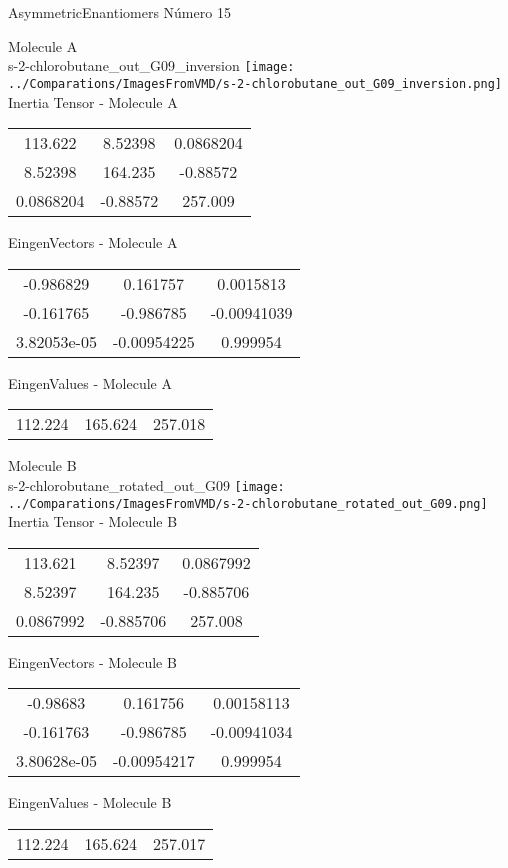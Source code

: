 \vtab[-2cm]
\begin{center}
{\large AsymmetricEnantiomers \tab Número 15}
\end{center}
\begin{multicols}{2}
\begin{center}

Molecule A \\ 
s-2-chlorobutane\_out\_G09\_inversion
\texttt{[image: ../Comparations/ImagesFromVMD/s-2-chlorobutane\_out\_G09\_inversion.png]}
\\
Inertia Tensor - Molecule A \\
\vtab

\begin{tabular}{|c c c|}
113.622	 & 	8.52398	 & 	0.0868204	 \\
8.52398	 & 	164.235	 & 	-0.88572	 \\
0.0868204	 & 	-0.88572	 & 	257.009
\end{tabular}

\vtab
 EingenVectors - Molecule A     \\
\vtab
\begin{tabular}{|c c c|}
-0.986829	 & 	0.161757	 & 	0.0015813	 \\
-0.161765	 & 	-0.986785	 & 	-0.00941039	 \\
3.82053e-05	 & 	-0.00954225	 & 	0.999954
\end{tabular}

\vtab
 EingenValues - Molecule A     \\
\vtab
\begin{tabular}{|c c c|}
112.224	 & 	165.624	 & 	257.018	 \\
\end{tabular}
\columnbreak

Molecule B \\ 
s-2-chlorobutane\_rotated\_out\_G09
\texttt{[image: ../Comparations/ImagesFromVMD/s-2-chlorobutane\_rotated\_out\_G09.png]}
\\
Inertia Tensor - Molecule B \\
\vtab

\begin{tabular}{|c c c|}
113.621	 & 	8.52397	 & 	0.0867992	 \\
8.52397	 & 	164.235	 & 	-0.885706	 \\
0.0867992	 & 	-0.885706	 & 	257.008
\end{tabular}

\vtab
 EingenVectors - Molecule B     \\
\vtab
\begin{tabular}{|c c c|}
-0.98683	 & 	0.161756	 & 	0.00158113	 \\
-0.161763	 & 	-0.986785	 & 	-0.00941034	 \\
3.80628e-05	 & 	-0.00954217	 & 	0.999954
\end{tabular}

\vtab
 EingenValues - Molecule B     \\
\vtab
\begin{tabular}{|c c c|}
112.224	 & 	165.624	 & 	257.017	 \\
\end{tabular}

\end{center}
\end{multicols}

